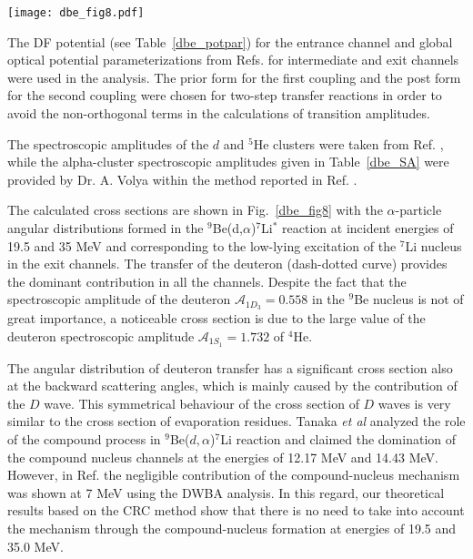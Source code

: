 \documentclass[
12pt, %
oneside, %
english, %
onehalfspacing, %
onehalfspacing, %
headsepline, %
]{MastersDoctoralThesis} %
\begin{document}
\begin{figure*}[tp]
\centering
\texttt{[image: dbe\_fig8.pdf]}
\decoRule
\caption{ \footnotesize Differential cross sections for the ${}^9$Be($d$,$\alpha$)${}^7$Li reactions measured at 19.5 MeV and 35 MeV energy with the ${}^{7}$Li observed in the ground or low-lying excited states in the exit channels.}
\label{dbe_fig8}
\end{figure*}	


The DF potential (see Table~\ref{dbe_potpar}) for the entrance channel and global optical potential parameterizations from Refs. \cite{globalTriton, globalAlpha, global6Li} for intermediate and exit channels were used in the analysis.
The prior form for the first coupling and the post form for the second coupling were chosen for two-step transfer reactions in order to avoid the non-orthogonal terms in the calculations of transition amplitudes.


The spectroscopic amplitudes of the $d$ and ${}^5$He clusters were taken from Ref. \cite{fiveSA}, while the alpha-cluster spectroscopic amplitudes given in Table~\ref{dbe_SA} were provided by Dr. A. Volya within the method reported in Ref. \cite{volya2017}.

The calculated cross sections are shown in Fig.~\ref{dbe_fig8} with the $\alpha$-particle angular distributions formed in the ${}^9$Be(d,$\alpha$)${}^7$Li$^*$ reaction at incident energies of 19.5 and 35 MeV and corresponding to the low-lying excitation of the ${}^7$Li nucleus in the exit channels. The transfer of the deuteron (dash-dotted curve) provides the dominant contribution in all the channels. Despite the fact that the spectroscopic amplitude of the deuteron $\mathcal{A}_{1{D}_3}=0.558$ in the ${}^9$Be nucleus is not of great importance, a noticeable cross section is due to the large value of the deuteron spectroscopic amplitude $\mathcal{A}_{1{S}_1}=1.732$  of ${}^4$He.

The angular distribution of deuteron transfer has a significant cross section also at the backward scattering angles, which is mainly caused by the contribution of the $D$ wave. This symmetrical behaviour of the cross section of $D$ waves is very similar to the cross section of evaporation residues. Tanaka \textit{et al} \cite{tanaka1978} analyzed the role of the compound process in ${}^9$Be($d,\alpha$)${}^7$Li reaction and claimed the domination of the compound nucleus channels at the energies of 12.17 MeV and 14.43 MeV. However, in Ref. \cite{bodek1989} the negligible contribution of the compound-nucleus mechanism was shown at 7 MeV using the DWBA analysis. In this regard, our theoretical results based on the CRC method show that there is no need to take into account the mechanism through the compound-nucleus formation at energies of 19.5 and 35.0 MeV.
\end{document}
